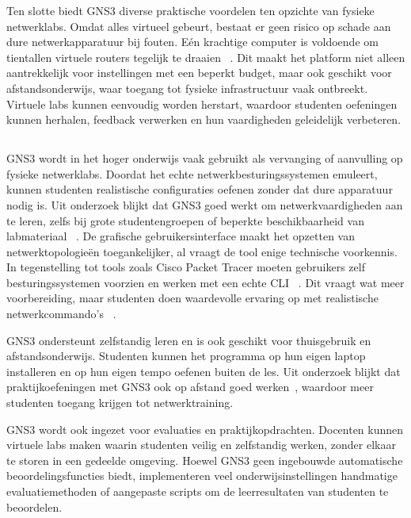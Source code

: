 \vspace{0.3cm}

Ten slotte biedt GNS3 diverse praktische voordelen ten opzichte van fysieke netwerklabs. Omdat alles virtueel gebeurt, bestaat er geen risico op schade aan dure netwerkapparatuur bij fouten. Eén krachtige computer is voldoende om tientallen virtuele routers tegelijk te draaien ~\autocite{Golightly2023}. Dit maakt het platform niet alleen aantrekkelijk voor instellingen met een beperkt budget, maar ook geschikt voor afstandsonderwijs, waar toegang tot fysieke infrastructuur vaak ontbreekt. Virtuele labs kunnen eenvoudig worden herstart, waardoor studenten oefeningen kunnen herhalen, feedback verwerken en hun vaardigheden geleidelijk verbeteren.

\subsection{}

GNS3 wordt in het hoger onderwijs vaak gebruikt als vervanging of aanvulling op fysieke netwerklabs. Doordat het echte netwerkbesturingssystemen emuleert, kunnen studenten realistische configuraties oefenen zonder dat dure apparatuur nodig is. Uit onderzoek blijkt dat GNS3 goed werkt om netwerkvaardigheden aan te leren, zelfs bij grote studentengroepen of beperkte beschikbaarheid van labmateriaal ~\autocite{Amrizal2022}. De grafische gebruikersinterface maakt het opzetten van netwerktopologieën toegankelijker, al vraagt de tool enige technische voorkennis. In tegenstelling tot tools zoals Cisco Packet Tracer moeten gebruikers zelf besturingssystemen voorzien en werken met een echte CLI ~\autocite{Sari2018}. Dit vraagt wat meer voorbereiding, maar studenten doen waardevolle ervaring op met realistische netwerkcommando’s ~\autocite{Amrizal2022}.

\vspace{0.3cm}

GNS3 ondersteunt zelfstandig leren en is ook geschikt voor thuisgebruik en afstandsonderwijs. Studenten kunnen het programma op hun eigen laptop installeren en op hun eigen tempo oefenen buiten de les. Uit onderzoek blijkt dat praktijkoefeningen met GNS3 ook op afstand goed werken~\autocite{Sari2018}, waardoor meer studenten toegang krijgen tot netwerktraining.

\vspace{0.3cm}

GNS3 wordt ook ingezet voor evaluaties en praktijkopdrachten. Docenten kunnen virtuele labs maken waarin studenten veilig en zelfstandig werken, zonder elkaar te storen in een gedeelde omgeving. Hoewel GNS3 geen ingebouwde automatische beoordelingsfuncties biedt, implementeren veel onderwijsinstellingen handmatige evaluatiemethoden of aangepaste scripts om de leerresultaten van studenten te beoordelen. ~\autocite{pythonautomation}

